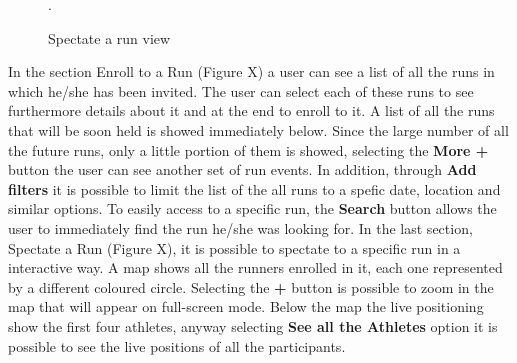 \begin{enumerate}
\begin{figure}[H]
\begin{center}
\begin{minipage}[c]{.40\textwidth}
	\caption{Spectate a run view}.
        \end{minipage}
      \end{center}
\end{figure}
In the section Enroll to a Run (Figure X) a user can see a list of all the runs in which he/she has been invited. The user can select each of these runs to see furthermore details about it and at the end to enroll to it. A list of all the runs that will be soon held is showed immediately below. Since the large number of all the future runs, only a little portion of them is showed, selecting the \textbf{More +} button the user can see another set of run events. In addition, through \textbf{Add filters} it is possible to limit the list of the all runs to a spefic date, location and similar options. To easily access to a specific run, the \textbf{Search} button allows the user to immediately find the run he/she was looking for. In the last section, Spectate a Run (Figure X), it is possible to spectate to a specific run in a interactive way. A map shows all the runners enrolled in it, each one represented by a different coloured circle. Selecting the \textbf{+} button is possible to zoom in the map that will appear on full-screen mode. Below the map the live positioning show the first four athletes, anyway selecting \textbf{See all the Athletes} option it is possible to see the live positions of all the participants.
\clearpage
\end{enumerate}